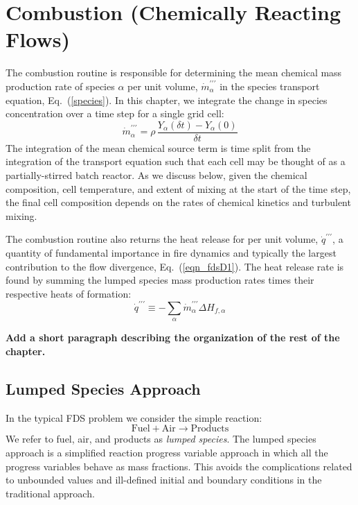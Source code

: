 \chapter{Combustion (Chemically Reacting Flows)}
\label{chapter:combustion}

\label{combustionsection}
The combustion routine is responsible for determining the mean chemical mass production rate of species $\alpha$ per unit volume, $\dot{m}^{\prime\prime\prime}_{\alpha}$ in the species transport equation, Eq.~(\ref{species}). In this chapter, we integrate the change in species concentration over a time step for a single grid cell:
\begin{equation}\label{eq:m_tprime_alpha}
\dot{m}^{\prime\prime\prime}_{\alpha}=\rho \,\frac{Y_\alpha(\delta t) - Y_\alpha(0)}{\delta t}
\end{equation}
The integration of the mean chemical source term is time split from the integration of the transport equation such that each cell may be thought of as a partially-stirred batch reactor.  As we discuss below, given the chemical composition, cell temperature, and extent of mixing at the start of the time step, the final cell composition depends on the rates of chemical kinetics and turbulent mixing.

The combustion routine also returns the heat release for per unit volume, $\dot{q}^{\prime\prime\prime}$, a quantity of fundamental importance in fire dynamics and typically the largest contribution to the flow divergence, Eq.~(\ref{eqn_fdsD1}).  The heat release rate is found by summing the lumped species mass production rates times their respective heats of formation:
\begin{equation}\label{eq:q_tprime}
\dot{q}^{\prime\prime\prime} \equiv -\displaystyle \sum_{\alpha} \dot{m}_\alpha^{\prime\prime\prime} \Delta H_{f,\alpha}
\end{equation}

{\bf Add a short paragraph describing the organization of the rest of the chapter.}


\section{Lumped Species Approach}
In the typical FDS problem we consider the simple reaction:
\begin{equation}\label{eq:simple}
\mathrm{Fuel + Air \rightarrow Products}
\end{equation}
We refer to fuel, air, and products as \emph{lumped species}.  The lumped species approach is a simplified reaction progress variable approach \cite{fox2003} in which all the progress variables behave as mass fractions. This avoids the complications related to unbounded values and ill-defined initial and boundary conditions in the traditional approach.

